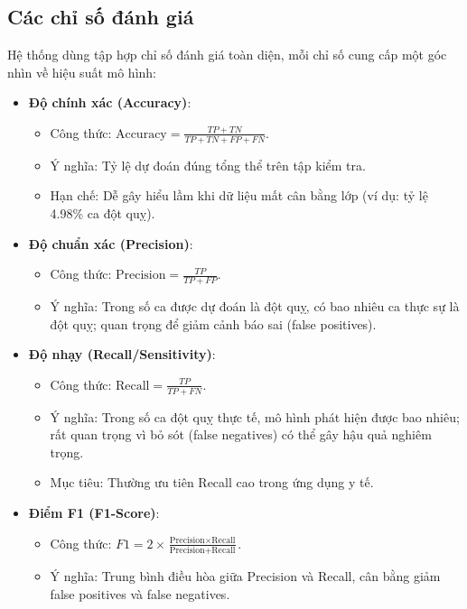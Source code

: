 ﻿\documentclass{article}
\begin{document}
\subsection{Các chỉ số đánh giá}
Hệ thống dùng tập hợp chỉ số đánh giá toàn diện, mỗi chỉ số cung cấp một góc nhìn về hiệu suất mô hình:

\begin{itemize}
    \item \textbf{Độ chính xác (Accuracy)}: 
    \begin{itemize}
        \item Công thức: $\text{Accuracy} = \frac{TP + TN}{TP + TN + FP + FN}$.
        \item Ý nghĩa: Tỷ lệ dự đoán đúng tổng thể trên tập kiểm tra.
        \item Hạn chế: Dễ gây hiểu lầm khi dữ liệu mất cân bằng lớp (ví dụ: tỷ lệ 4.98\% ca đột quỵ).
    \end{itemize}
    
    \item \textbf{Độ chuẩn xác (Precision)}:
    \begin{itemize}
        \item Công thức: $\text{Precision} = \frac{TP}{TP + FP}$.
        \item Ý nghĩa: Trong số ca được dự đoán là đột quỵ, có bao nhiêu ca thực sự là đột quỵ; quan trọng để giảm cảnh báo sai (false positives).
    \end{itemize}
    
    \item \textbf{Độ nhạy (Recall/Sensitivity)}:
    \begin{itemize}
        \item Công thức: $\text{Recall} = \frac{TP}{TP + FN}$.
        \item Ý nghĩa: Trong số ca đột quỵ thực tế, mô hình phát hiện được bao nhiêu; rất quan trọng vì bỏ sót (false negatives) có thể gây hậu quả nghiêm trọng.
        \item Mục tiêu: Thường ưu tiên Recall cao trong ứng dụng y tế.
    \end{itemize}
    
    \item \textbf{Điểm F1 (F1-Score)}:
    \begin{itemize}
        \item Công thức: $F1 = 2 \times \frac{\text{Precision} \times \text{Recall}}{\text{Precision} + \text{Recall}}$.
        \item Ý nghĩa: Trung bình điều hòa giữa Precision và Recall, cân bằng giảm false positives và false negatives.
    \end{itemize}
    

\end{itemize}
\end{document}

